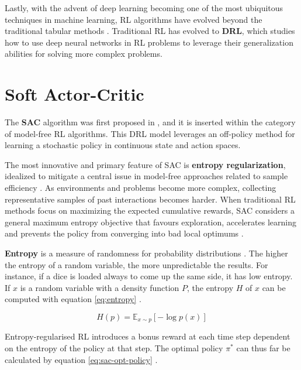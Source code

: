 Lastly, with the advent of deep learning becoming one of the most ubiquitous techniques in machine learning, \ac{RL} algorithms have evolved beyond the traditional tabular methods \cite{moralesGrokkingDeepReinforcement2020}. Traditional \ac{RL} has evolved to \textbf{\acf{DRL}}, which studies how to use deep neural networks in \ac{RL} problems to leverage their generalization abilities for solving more complex problems.

\section{Soft Actor-Critic}

The \textbf{\acf{SAC}} algorithm was first proposed in \cite{haarnojaSoftActorCriticOffPolicy2018}, and it is inserted within the category of model-free \acf{RL} algorithms. This \acf{DRL} model leverages an off-policy method for learning a stochastic policy in continuous state and action spaces. 

The most innovative and primary feature of \ac{SAC} is \textbf{entropy regularization}, idealized to mitigate a central issue in model-free approaches related to sample efficiency \cite{openaiSpinningDocumentation, haarnojaSoftActorCriticOffPolicy2018}. As environments and problems become more complex, collecting representative samples of past interactions becomes harder. When traditional \ac{RL} methods focus on maximizing the expected cumulative rewards, \ac{SAC} considers a general maximum entropy objective that favours exploration, accelerates learning and prevents the policy from converging into bad local optimums \cite{haarnojaSoftActorCriticOffPolicy2018}.

\textbf{Entropy} is a measure of randomness for probability distributions \cite{openaiSpinningDocumentation}. The higher the entropy of a random variable, the more unpredictable the results. For instance, if a dice is loaded always to come up the same side, it has low entropy. If $x$ is a random variable with a density function $P$, the entropy $H$ of $x$ can be computed with equation  \ref{eq:entropy} \cite{openaiSpinningDocumentation}.

\begin{equation} \label{eq:entropy}
H(p) = \mathbb{E}_{x \sim p}[-\log p(x)]
\end{equation} 

Entropy-regularised \ac{RL} introduces a bonus reward at each time step dependent on the entropy of the policy at that step. The optimal policy $\pi^*$ can thus far be calculated by equation \ref{eq:sac-opt-policy} \cite{openaiSpinningDocumentation}.


